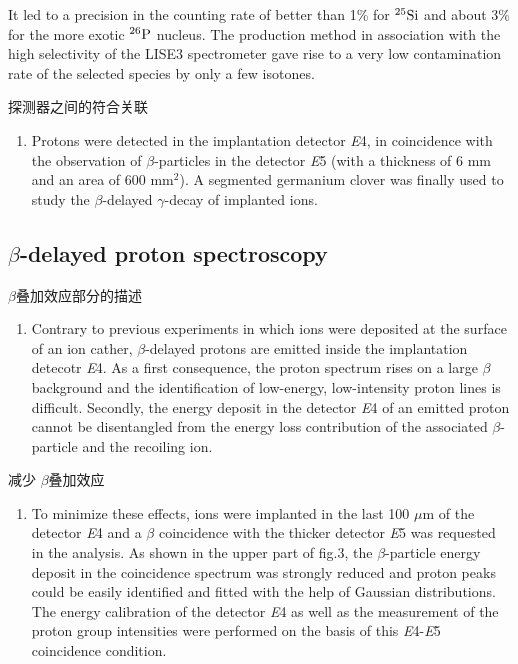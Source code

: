 \documentclass[a4paper]{article}
\begin{document}
 It led to a precision in the counting rate of better than 1\% for $^{25}\textnormal{Si}$ and about 3\% for the more exotic $^{26}\textnormal{P}$ nucleus. The production method in association with the high selectivity of the LISE3 spectrometer gave rise to a very low contamination rate of the selected species by only a few isotones.

探测器之间的符合关联
\begin{enumerate}
    \item Protons were detected in the implantation detector \textit{E}4, in coincidence with the observation of $\beta$-particles in the detector \textit{E}5 (with a thickness of 6 mm and an area of 600 mm$^{2}$). A segmented germanium clover was finally used to study the $\beta$-delayed $\gamma$-decay of implanted ions.
\end{enumerate}

\subsection{$\beta$-delayed proton spectroscopy}
$\beta$叠加效应部分的描述
\begin{enumerate}
    \item Contrary to previous experiments in which ions were deposited at the surface of an ion cather, $\beta$-delayed protons are emitted inside the implantation detecotr \textit{E}4. As a first consequence, the proton spectrum rises on a large $\beta$ background and the identification of low-energy, low-intensity proton lines is difficult. Secondly, the energy deposit in the detector \textit{E}4 of an emitted proton cannot be disentangled from the energy loss contribution of the associated $\beta$-particle and the recoiling ion.
\end{enumerate}

减少 $\beta$叠加效应
\begin{enumerate}
    \item To minimize these effects, ions were implanted in the last 100 $\mu$m of the detector \textit{E}4 and a $\beta$ coincidence with the thicker detector \textit{E}5 was requested in the analysis. As shown in the upper part of fig.3, the $\beta$-particle energy deposit in the coincidence spectrum was strongly reduced and proton peaks could be easily identified and fitted with the help of Gaussian distributions. The energy calibration of the detector \textit{E}4 as well as the measurement of the proton group intensities were performed on the basis of this \textit{E}4-\textit{E}5 coincidence condition.
\end{enumerate}
\end{document}
